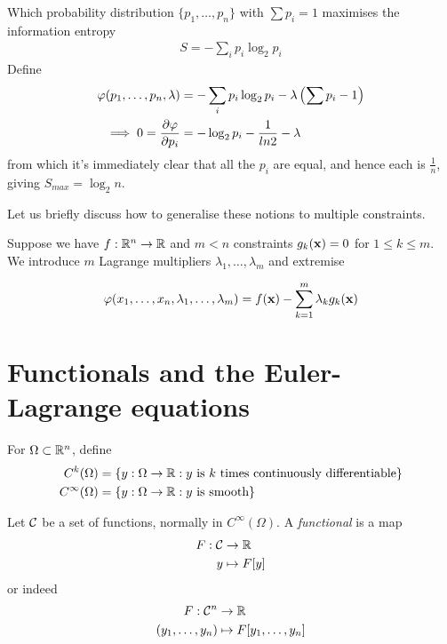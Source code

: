 \documentclass{../../template/note}
\begin{document}
    \begin{example*}
        Which probability distribution $\{p_1, \dots, p_n\}$ with $\sum p_i = 1$ maximises the information entropy
        \begin{align*}
            S = -\sum_i p_i \log_2 p_i
        \end{align*}
        Define
        \begin{align*}
            \varphi(p_1, \dots, p_n, \lambda) &= -\sum_i p_i \log_2 p_i - \lambda\left(\sum p_i -1\right) \\
            \implies 0 = \pd{\varphi}{p_i} &= -\log_2 p_i - \frac 1 {ln 2} - \lambda
        \end{align*}
        from which it's immediately clear that all the $p_i$ are equal, and hence each is $\frac 1 n$, giving $S_{max} = \log_2 n$.        
    \end{example*}
    
    Let us briefly discuss how to generalise these notions to multiple constraints.

    Suppose we have $f: \mathbb R^n \to \mathbb R$ and $m < n$ constraints $g_k(\V x) = 0$ for $1 \leq k \leq m$. We introduce $m$ Lagrange multipliers $\lambda_1, \dots, \lambda_m$ and extremise

    \begin{align*}
        \varphi(x_1, \dots, x_n, \lambda_1, \dots, \lambda_m) = f(\V x) - \sum_{k=1}^m \lambda_k g_k(\V x)
    \end{align*}
    
    \section{Functionals and the Euler-Lagrange equations}

    \begin{definition}
        For $\Omega \subset \mathbb R^n$, define
        \begin{align*}
            C^k(\Omega) &= \{y: \Omega \to \mathbb R: y \text{ is } k \text{ times continuously differentiable}\} \\
            C^\infty(\Omega) &= \{y: \Omega \to \mathbb R: y \text{ is smooth}\}
        \end{align*}      
    \end{definition}
    
    \begin{definition}[Functionals]
        Let $\mathcal{C}$ be a set of functions, normally in $C^\infty(\Omega)$. A \emph{functional} is a map
        \begin{align*}
            F: \mathcal{C} &\to \mathbb R \\
            y &\mapsto F[y]
        \end{align*}
        or indeed
        \begin{align*}
            F: \mathcal{C}^n &\to \mathbb R \\
            (y_1, \dots, y_n) &\mapsto F[y_1, \dots, y_n]
        \end{align*}       
    \end{definition}
    
\end{document}
